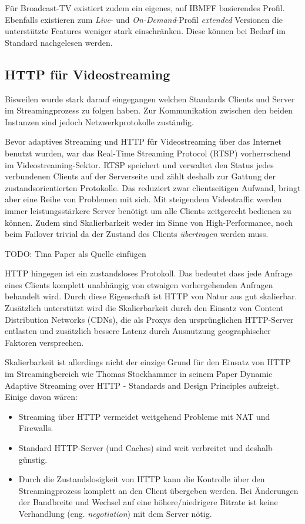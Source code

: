 \documentclass[paper = a4, fontsize = 12pt, parskip = half]{scrartcl} %
\begin{document}
Für Broadcast-TV existiert zudem ein eigenes, auf IBMFF basierendes Profil. Ebenfalls existieren zum \textit{Live}- und \textit{On-Demand}-Profil \textit{extended} Versionen die unterstützte Features weniger stark einschränken. Diese können bei Bedarf im Standard nachgelesen werden.

\subsection{HTTP für Videostreaming}
Bisweilen wurde stark darauf eingegangen welchen Standards Clients und Server im Streamingprozess zu folgen haben. Zur Kommunikation zwischen den beiden Instanzen sind jedoch Netzwerkprotokolle zuständig.

Bevor adaptives Streaming und HTTP für Videostreaming über das Internet benutzt wurden, war das Real-Time Streaming Protocol (RTSP) vorherrschend im Videostreaming-Sektor. RTSP speichert und verwaltet den Status jedes verbundenen Clients auf der Serverseite und zählt deshalb zur Gattung der zustandsorientierten Protokolle. Das reduziert zwar clientseitigen Aufwand, bringt aber eine Reihe von Problemen mit sich. Mit steigendem Videotraffic werden immer leistungsstärkere Server benötigt um alle Clients zeitgerecht bedienen zu können. Zudem sind Skalierbarkeit weder im Sinne von High-Performance, noch beim Failover trivial da der Zustand des Clients \textit{übertragen} werden muss.

TODO: Tina Paper als Quelle einfügen

HTTP hingegen ist ein zustandsloses Protokoll. Das bedeutet dass jede Anfrage eines Clients komplett unabhängig von etwaigen vorhergehenden Anfragen behandelt wird. Durch diese Eigenschaft ist HTTP von Natur aus gut skalierbar. Zusätzlich unterstützt wird die Skalierbarkeit durch den Einsatz von Content Distribution Networks (CDNs), die als Proxys den ursprünglichen HTTP-Server entlasten und zusätzlich bessere Latenz durch Ausnutzung geographischer Faktoren versprechen.

Skalierbarkeit ist allerdings nicht der einzige Grund für den Einsatz von HTTP im Streamingbereich wie Thomas Stockhammer in seinem Paper \glqq Dynamic Adaptive Streaming over HTTP - Standards and Design Principles \grqq aufzeigt. Einige davon wären: 

\begin{itemize}
	\item Streaming über HTTP vermeidet weitgehend Probleme mit NAT und Firewalls.
	\item Standard HTTP-Server (und Caches) sind weit verbreitet und deshalb günstig.
	\item Durch die Zustandslosigkeit von HTTP kann die Kontrolle über den Streamingprozess komplett an den Client übergeben werden. Bei Änderungen der Bandbreite und Wechsel auf eine höhere/niedrigere Bitrate ist keine Verhandlung (eng. \textit{negotiation}) mit dem Server nötig.
\end{itemize}
\end{document}
